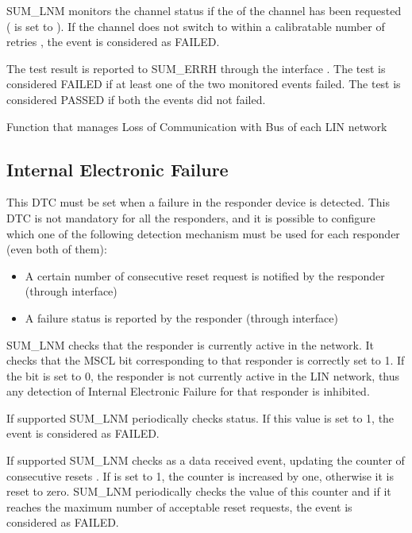 {
SUM_LNM monitors the channel status if the  of the channel has been requested ( is set to ). If the channel does not switch to  within a
calibratable number of retries , the event is considered as FAILED. 
}
{  }

{
The test result is reported to SUM_ERRH through the interface . The test is considered FAILED if at least one of the two monitored events failed. The test is considered PASSED if both the events did
not failed.
}
{ }

{}
{}
{}
{}
{Function that manages Loss of Communication with Bus of each LIN network}

\subsection{Internal Electronic Failure}
\label{subsec:IEF}
This DTC must be set when a failure in the responder device is detected. This DTC is not mandatory for all the responders, and it is possible to configure which one of the following detection mechanism must be used for each responder 
(even both of them):

\begin{itemize}
    \item A certain number of consecutive reset request is notified by the responder (through  interface)
	\item A failure status is reported by the responder (through  interface)
\end{itemize}

{
SUM_LNM checks that the responder is currently active in the network. It checks that the MSCL bit corresponding to that responder is correctly set to 1. If the bit is set to 0, the responder is not currently active in
the LIN network, thus any detection of Internal Electronic Failure for that responder is inhibited.
}
{}

{
If supported SUM_LNM periodically checks  status. If this value is set to 1, the event is considered as FAILED.

If supported SUM_LNM checks  as a data received event, updating the counter of consecutive resets . If  is set to 1, the counter is increased by one,
otherwise it is reset to zero. SUM_LNM periodically checks the value of this counter and if it reaches the maximum number of acceptable reset requests, the event is considered as FAILED.
}
{  }


